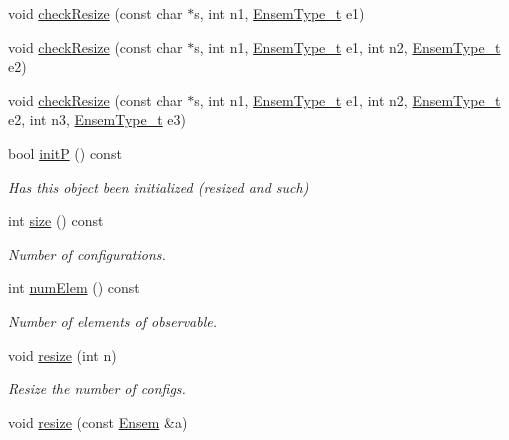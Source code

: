 \begin{DoxyCompactItemize}
\item 
void \mbox{\hyperlink{classENSEM_1_1Ensem_a1cebe5f8cc3d849d6b4dc7d9d10c636b}{check\+Resize}} (const char $\ast$s, int n1, \mbox{\hyperlink{namespaceENSEM_a2dc2c4a26884f343471e52f23479ddbe}{Ensem\+Type\+\_\+t}} e1)
\item 
void \mbox{\hyperlink{classENSEM_1_1Ensem_acb139b6e03db52a9190de9ea4830addb}{check\+Resize}} (const char $\ast$s, int n1, \mbox{\hyperlink{namespaceENSEM_a2dc2c4a26884f343471e52f23479ddbe}{Ensem\+Type\+\_\+t}} e1, int n2, \mbox{\hyperlink{namespaceENSEM_a2dc2c4a26884f343471e52f23479ddbe}{Ensem\+Type\+\_\+t}} e2)
\item 
void \mbox{\hyperlink{classENSEM_1_1Ensem_a893d2925ef3c942b9d25b0a6e6db619c}{check\+Resize}} (const char $\ast$s, int n1, \mbox{\hyperlink{namespaceENSEM_a2dc2c4a26884f343471e52f23479ddbe}{Ensem\+Type\+\_\+t}} e1, int n2, \mbox{\hyperlink{namespaceENSEM_a2dc2c4a26884f343471e52f23479ddbe}{Ensem\+Type\+\_\+t}} e2, int n3, \mbox{\hyperlink{namespaceENSEM_a2dc2c4a26884f343471e52f23479ddbe}{Ensem\+Type\+\_\+t}} e3)
\item 
bool \mbox{\hyperlink{classENSEM_1_1Ensem_af76aaa7b0f354006786dce06dc04669d}{initP}} () const
\begin{DoxyCompactList}\small\item\em Has this object been initialized (resized and such) \end{DoxyCompactList}\item 
int \mbox{\hyperlink{classENSEM_1_1Ensem_ae8cf08459492240dcab13d4ab3a21216}{size}} () const
\begin{DoxyCompactList}\small\item\em Number of configurations. \end{DoxyCompactList}\item 
int \mbox{\hyperlink{classENSEM_1_1Ensem_a495a563176192200eca2f16978158750}{num\+Elem}} () const
\begin{DoxyCompactList}\small\item\em Number of elements of observable. \end{DoxyCompactList}\item 
void \mbox{\hyperlink{classENSEM_1_1Ensem_ae43aa68aaca92143baffe83310657f4a}{resize}} (int n)
\begin{DoxyCompactList}\small\item\em Resize the number of configs. \end{DoxyCompactList}\item 
void \mbox{\hyperlink{classENSEM_1_1Ensem_acf1e1629e4e10dbd254d81d14271b763}{resize}} (const \mbox{\hyperlink{classENSEM_1_1Ensem}{Ensem}} \&a)

\end{DoxyCompactItemize}
